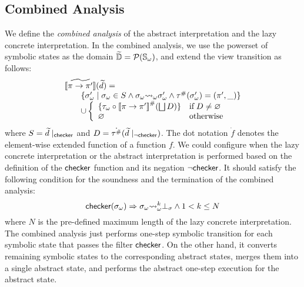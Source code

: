 \subsection{Combined Analysis}

We define the \textit{combined analysis} of the abstract interpretation and the
lazy concrete interpretation.  In the combined analysis, we use the powerset of
symbolic states as the domain $\widetilde{\mathbb{D}} = \mathcal{P}({\mathbb{S}}_\omega)$, and extend the
view transition as follows:
\[
  \begin{array}{l}
    [\![{\widetilde{\pi \rightarrow \pi'}}]\!](\widetilde{d}) =\\
    \qquad \{
      {\sigma}_\omega' \mid {\sigma}_\omega \in S \wedge
      {\sigma}_\omega {\leadsto}_\omega {\sigma}_\omega' \wedge
      {\tau}^{\#}({\sigma}_\omega') = (\pi', \_)
    \}\\
    \qquad \cup \left\{
    \begin{array}{ll}
      \{ {\tau}_\omega \circ {[\![{\pi\rightarrow \pi'}]\!]}^{\#}(\bigsqcup D) \}
      & \text{if} \; D \neq \varnothing\\
      \varnothing & \text{otherwise}\\
    \end{array}
    \right.
  \end{array}
\]
where $S = \widetilde{d}\mid_{\textsf{checker}}$ and $D =
\dot{{\tau}^{\#}}(\widetilde{d}\mid_{\neg\textsf{checker}})$.  The dot notation $\dot{f}$
denotes the element-wise extended function of a function $f$.  We could
configure when the lazy concrete interpretation or the abstract interpretation
is performed based on the definition of the $\textsf{checker}$ function and its negation
$\neg\textsf{checker}$.  It should satisfy the following condition for the soundness and
the termination of the combined analysis:
\[
  \textsf{checker}({\sigma}_\omega) \Rightarrow {\sigma}_\omega {\leadsto}_\omega^k \bot_\sigma \wedge
  1 < k \leq N
\]
where $N$ is the pre-defined maximum length of the lazy concrete interpretation.
The combined analysis just performs one-step symbolic transition for each
symbolic state that passes the filter $\textsf{checker}$. On the other hand, it converts
remaining symbolic states to the corresponding abstract states, merges them into
a single abstract state, and performs the abstract one-step execution for the
abstract state.

